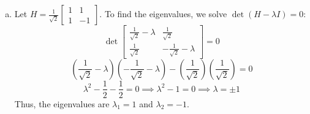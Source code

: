 \documentclass{article}
\begin{document}
\begin{enumerate}[(a)]
    \textbf{For $\lambda_2 = -1$:}
    We solve $(\lambda_2 I - X)v_2 = 0$ where $v_2 = \begin{bmatrix} x \\ y \end{bmatrix}$:
    \[
    \begin{bmatrix} -1 & -1 \\ -1 & -1 \end{bmatrix} \begin{bmatrix} x \\ y \end{bmatrix} = \begin{bmatrix} 0 \\ 0 \end{bmatrix} \implies -x - y = 0 \implies y = -x
    \]
    Choosing $x = 1$ gives $y = -1$, so the unnormalized eigenvector is $\begin{bmatrix} 1 \\ -1 \end{bmatrix}$. Normalizing to unit length ($\|v_2\| = \sqrt{1^2 + (-1)^2} = \sqrt{2}$):
    \[
    v_2 = \frac{1}{\sqrt{2}} \begin{bmatrix} 1 \\ -1 \end{bmatrix} = \ket{-}
    \]

    \item Let $H = \frac{1}{\sqrt{2}} \begin{bmatrix} 1 & 1 \\ 1 & -1 \end{bmatrix}$. To find the eigenvalues, we solve $\det(H - \lambda I) = 0$:
    \[
    \det \begin{bmatrix} \frac{1}{\sqrt{2}} - \lambda & \frac{1}{\sqrt{2}} \\ \frac{1}{\sqrt{2}} & -\frac{1}{\sqrt{2}} - \lambda \end{bmatrix} = 0
    \]
    \[
    \left(\frac{1}{\sqrt{2}} - \lambda\right)\left(-\frac{1}{\sqrt{2}} - \lambda\right) - \left(\frac{1}{\sqrt{2}}\right)\left(\frac{1}{\sqrt{2}}\right) = 0
    \]
    \[
    \lambda^2 - \frac{1}{2} - \frac{1}{2} = 0 \implies \lambda^2 - 1 = 0 \implies \lambda = \pm 1
    \]
    Thus, the eigenvalues are $\lambda_1 = 1$ and $\lambda_2 = -1$.


\end{enumerate}
\end{document}
